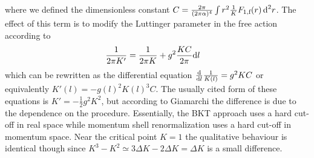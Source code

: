 \documentclass[english, parskip=full]{scrartcl}
\begin{document}
where we defined the dimensionless constant $C = \frac{2\pi}{(2\pi\alpha)^4}\int r^2 \frac{1}{K} F_{1,\text{f}}(r)\,\text{d}^2r$.
The effect of this term is to modify the Luttinger parameter in the free action according to
\begin{align}
\frac{1}{2\pi K'} &= \frac{1}{2\pi K} + g^2\frac{KC}{2\pi} \text{d} l
\end{align}
which can be rewritten as the differential equation $\frac{\text{d}}{\text{d} l}\frac{1}{K(l)} = g^2 KC$ or equivalently $K'(l) = -g(l)^2 K(l)^3 C$.
The usually cited form of these equations is $K'=-\frac{1}{2} g^2 K^2$, but according to Giamarchi the difference is due to the dependence on the procedure.
Essentially, the BKT approach uses a hard cut-off in real space while momentum shell renormalization uses a hard cut-off in momentum space.
Near the critical point $K=1$ the qualitative behaviour is identical though since $K^3-K^2 \simeq 3\Delta K - 2\Delta K = \Delta K$ is a small difference.



\end{document}
